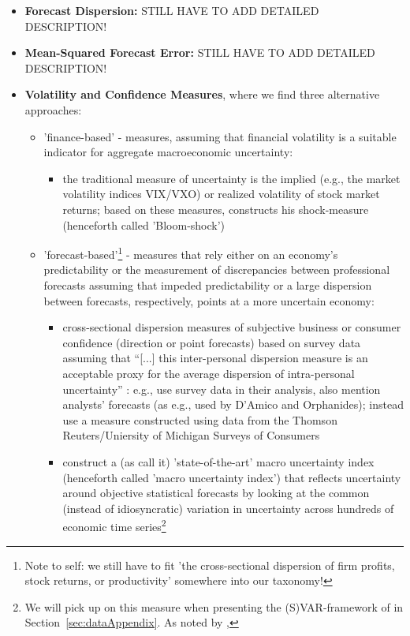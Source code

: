 \documentclass[a4paper,11pt,listof=nochaptergap,oneside,pointednumbers,bibtotoc,bigheadings,liststotoc]{scrbook}
\theoremstyle{mysatz}
\theoremstyle{mydefinition}
\theoremstyle{mytheorem}
\theoremstyle{mybemerkung}
\begin{document}
\begin{itemize}
	\item \textbf{Forecast Dispersion:} STILL HAVE TO ADD DETAILED DESCRIPTION!
	\item \textbf{Mean-Squared Forecast Error:} STILL HAVE TO ADD DETAILED DESCRIPTION!
	\item \textbf{Volatility and Confidence Measures}, where we find three alternative approaches:
		\begin{itemize}
			\item 'finance-based' - measures, assuming that financial volatility is a suitable indicator for aggregate macroeconomic uncertainty: 
			\begin{itemize}
				\item the traditional measure of uncertainty is the implied (e.g., the market volatility indices VIX/VXO) or realized volatility of stock market returns; based on these measures, \citet{bloom:09} constructs his shock-measure (henceforth called 'Bloom-shock')
			\end{itemize}
			\item 'forecast-based'\footnote{Note to self: we still have to fit 'the cross-sectional dispersion of firm profits, stock returns, or productivity' somewhere into our taxonomy!} - measures that rely either on an economy's predictability or the measurement of discrepancies between professional forecasts assuming that impeded predictability or a large dispersion between forecasts, respectively, points at a more uncertain economy:
			\begin{itemize}
				\item cross-sectional dispersion measures of subjective business or consumer confidence (direction or point forecasts) based on survey data assuming that ``[...] this inter-personal dispersion measure is an acceptable proxy for the average dispersion of intra-personal uncertainty'' \citep[p. 4]{IMF:17}: e.g., \citet{bachmannetal:13} use survey data in their analysis, \citet{juradoetal:15} also mention analysts' forecasts (as e.g., used by D'Amico and Orphanides); \citet{leducandliu:16} instead use a measure constructed using data from the Thomson Reuters/Uniersity of Michigan Surveys of Consumers
				\item \citet{juradoetal:15} construct a (as \citet{orlikandveldkamp:14} call it) 'state-of-the-art' macro uncertainty index (henceforth called 'macro uncertainty index') that reflects uncertainty around objective statistical forecasts by looking at the common (instead of idiosyncratic) variation in uncertainty across hundreds of economic time series\footnote{We will pick up on this measure when presenting the (S)VAR-framework of \citet{ludvigsonetal:18} in Section~\ref{sec:dataAppendix}. As noted by \citet{IMF:17}, }				

\end{itemize}
\end{itemize}
\end{itemize}
\end{document}
